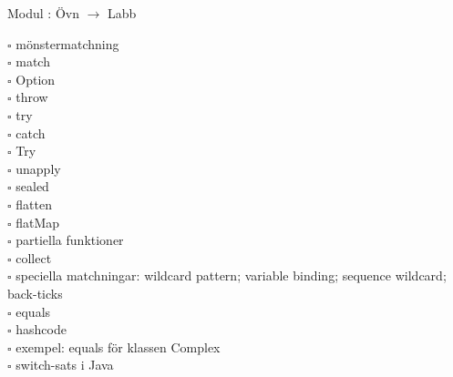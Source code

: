 
Modul : Övn  $\rightarrow$ Labb 
\begin{multicols}{3}\SlideFontTiny
$\square$ mönstermatchning \\
$\square$ match \\
$\square$ Option \\
$\square$ throw \\
$\square$ try \\
$\square$ catch \\
$\square$ Try \\
$\square$ unapply \\
$\square$ sealed \\
$\square$ flatten \\
$\square$ flatMap \\
$\square$ partiella funktioner \\
$\square$ collect \\
$\square$ speciella matchningar: wildcard pattern; variable binding; sequence wildcard; back-ticks \\
$\square$ equals \\
$\square$ hashcode \\
$\square$ exempel: equals för klassen Complex \\
$\square$ switch-sats i Java \\     
\end{multicols}
